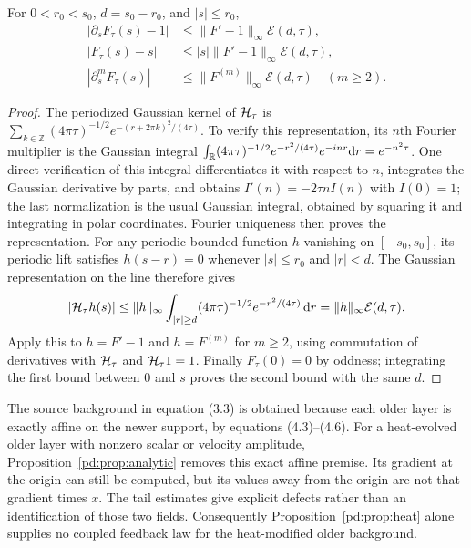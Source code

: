 \begin{pdproposition}\label{pd:prop:tail}
For $0<r_0<s_0$, $d=s_0-r_0$, and $|s|\leq r_0$,
\begin{align}
 |\partial_sF_\tau(s)-1|&\leq\|F'-1\|_\infty\mathcal E(d,\tau),\label{pd:eq:tail1}\\
 |F_\tau(s)-s|&\leq |s|\|F'-1\|_\infty\mathcal E(d,\tau),\label{pd:eq:tail0}\\
 |\partial_s^mF_\tau(s)|&\leq\|F^{(m)}\|_\infty\mathcal E(d,\tau)
   \quad(m\geq2).\label{pd:eq:tailm}
\end{align}
\end{pdproposition}
\begin{proof}
The periodized Gaussian kernel of $\mathcal H_\tau$ is
$\sum_{k\in\mathbb Z}(4\pi\tau)^{-1/2}
e^{-(r+2\pi k)^2/(4\tau)}$. To verify this representation, its $n$th
Fourier multiplier is the Gaussian integral
$\int_{\mathbb R}(4\pi\tau)^{-1/2}e^{-r^2/(4\tau)}e^{-inr}\mathrm d r=e^{-n^2\tau}$.
One direct verification of this integral differentiates it with respect
to $n$, integrates the Gaussian derivative by parts, and obtains
$I'(n)=-2\tau n I(n)$ with $I(0)=1$; the last normalization is the usual
Gaussian integral, obtained by squaring it and integrating in polar
coordinates. Fourier uniqueness then proves the representation.
For any periodic bounded function $h$ vanishing on $[-s_0,s_0]$, its
periodic lift satisfies $h(s-r)=0$ whenever $|s|\leq r_0$ and $|r|<d$.
The Gaussian representation on the line therefore gives
\[
 |\mathcal H_\tau h(s)|\leq
 \|h\|_\infty\int_{|r|\geq d}
 (4\pi\tau)^{-1/2}e^{-r^2/(4\tau)}\,\mathrm d r
 =\|h\|_\infty\mathcal E(d,\tau).
\]
Apply this to $h=F'-1$ and $h=F^{(m)}$ for $m\geq2$, using commutation
of derivatives with $\mathcal H_\tau$ and $\mathcal H_\tau1=1$.
Finally $F_\tau(0)=0$ by oddness; integrating the first bound between
$0$ and $s$ proves the second bound with the same $d$.
\end{proof}

The source background in equation (3.3) is obtained because each older
layer is exactly affine on the newer support, by equations (4.3)--(4.6).
For a heat-evolved older layer with nonzero scalar or velocity amplitude,
Proposition~\ref{pd:prop:analytic} removes this exact affine premise.
Its gradient at the origin can still be computed, but its values away
from the origin are not that gradient times $x$. The tail estimates give
explicit defects rather than an identification of those two fields.
Consequently Proposition~\ref{pd:prop:heat} alone supplies no coupled feedback
law for the heat-modified older background.

